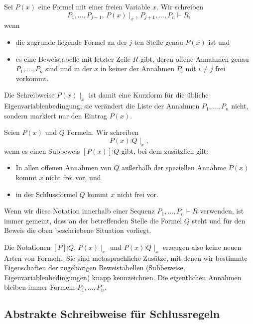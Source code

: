 \documentclass[main.tex]{subfiles}
\begin{document}
\begin{definition}
Sei \(P(x)\) eine Formel mit einer freien Variable \(x\). Wir schreiben
\[
  P_1,\dots,P_{j-1},\,P(x)\mid_x,\,P_{j+1},\dots,P_n \vdash R,
\]
wenn
\begin{itemize}
  \item die zugrunde liegende Formel an der \(j\)-ten Stelle genau \(P(x)\)
        ist und
  \item es eine Beweistabelle mit letzter Zeile \(R\) gibt, deren offene
        Annahmen genau \(P_1,\dots,P_n\) sind und in der \(x\) in keiner
        der Annahmen \(P_i\) mit \(i\neq j\) frei vorkommt.
\end{itemize}
Die Schreibweise \(P(x)\mid_x\) ist damit eine Kurzform für die übliche
Eigenvariablenbedingung; sie verändert die Liste der Annahmen
\(P_1,\dots,P_n\) nicht, sondern markiert nur den Eintrag \(P(x)\).
\end{definition}

\begin{definition}
Seien \(P(x)\) und \(Q\) Formeln. Wir schreiben
\[
  P(x)\vdots Q\mid_x,
\]
wenn es einen Subbeweis \([P(x)]\vdots Q\) gibt, bei dem zusätzlich gilt:
\begin{itemize}
  \item In allen offenen Annahmen von \(Q\) außerhalb der speziellen Annahme
        \(P(x)\) kommt \(x\) nicht frei vor, und
  \item in der Schlussformel \(Q\) kommt \(x\) nicht frei vor.
\end{itemize}
Wenn wir diese Notation innerhalb einer Sequenz \(P_1,\dots,P_n \vdash R\)
verwenden, ist immer gemeint, dass an der betreffenden Stelle die Formel
\(Q\) steht und für den Beweis die oben beschriebene Situation vorliegt.
\end{definition}

\begin{remark}
Die Notationen \([P]\vdots Q\), \(P(x)\mid_x\) und \(P(x)\vdots Q\mid_x\)
erzeugen also keine neuen Arten von Formeln. Sie sind metasprachliche
Zusätze, mit denen wir bestimmte Eigenschaften der zugehörigen
Beweistabellen (Subbeweise, Eigenvariablenbedingungen) knapp
kennzeichnen. Die eigentlichen Annahmen bleiben immer Formeln
\(P_1,\dots,P_n\).
\end{remark}

\subsection{Abstrakte Schreibweise für Schlussregeln}
\end{document}
